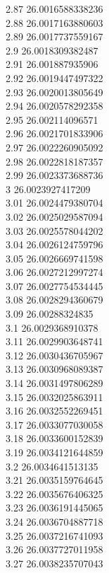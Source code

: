 {2.87	26.0016588338236\\
2.88	26.0017163880603\\
2.89	26.0017737559167\\
2.9	26.0018309382487\\
2.91	26.001887935906\\
2.92	26.0019447497322\\
2.93	26.0020013805649\\
2.94	26.0020578292358\\
2.95	26.002114096571\\
2.96	26.0021701833906\\
2.97	26.0022260905092\\
2.98	26.0022818187357\\
2.99	26.0023373688736\\
3	26.0023927417209\\
3.01	26.0024479380704\\
3.02	26.0025029587094\\
3.03	26.0025578044202\\
3.04	26.0026124759796\\
3.05	26.0026669741598\\
3.06	26.0027212997274\\
3.07	26.0027754534445\\
3.08	26.0028294360679\\
3.09	26.00288324835\\
3.1	26.0029368910378\\
3.11	26.0029903648741\\
3.12	26.0030436705967\\
3.13	26.0030968089387\\
3.14	26.0031497806289\\
3.15	26.0032025863911\\
3.16	26.0032552269451\\
3.17	26.0033077030058\\
3.18	26.0033600152839\\
3.19	26.0034121644859\\
3.2	26.0034641513135\\
3.21	26.0035159764645\\
3.22	26.0035676406325\\
3.23	26.0036191445065\\
3.24	26.0036704887718\\
3.25	26.0037216741093\\
3.26	26.0037727011958\\
3.27	26.0038235707043\\
}
